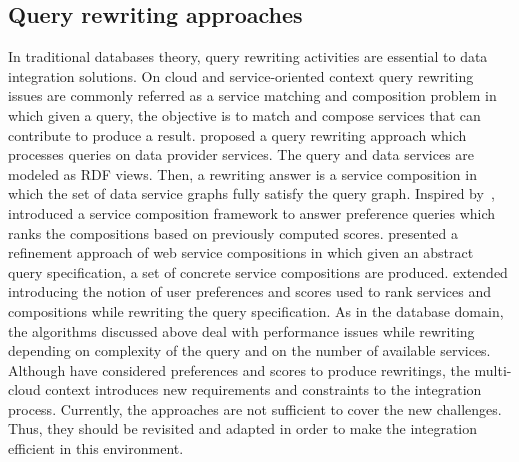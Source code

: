 \subsection{Query rewriting approaches}
In traditional databases theory, query rewriting activities are essential to 
data integration solutions. On cloud and service-oriented context query rewriting issues
are commonly referred as a service matching and composition problem in which given a query, 
the objective is to match and compose services that can contribute to produce a result. 
\cite{Barhamgi2010} proposed a query rewriting approach which processes queries on data provider services.
The query and data services are modeled as RDF views. Then, a rewriting answer is a 
service composition in which the set of data service graphs fully satisfy the query graph.  
%
Inspired by~\cite{Barhamgi2010}, \cite{Benouaret2011} introduced a service composition 
framework to answer preference queries which ranks the compositions based on previously 
computed scores.
%
\cite{Umberto} presented a refinement approach of web service compositions in which
given an abstract query specification, a set of concrete service compositions are produced.
%
\cite{ba2014} extended \cite{Umberto} introducing the notion of user preferences and scores 
used to rank services and compositions while rewriting the query specification.
%
As in the database domain, the algorithms discussed above deal with performance issues
while rewriting depending on complexity of the query and on the number of available services.
Although \cite{Benouaret2011,ba2014} have considered preferences and scores to produce rewritings, the multi-cloud context introduces new requirements and constraints to the integration process. Currently, the approaches are not sufficient to cover the new challenges. Thus, they should be revisited and adapted in order to make the integration efficient in this environment. 


